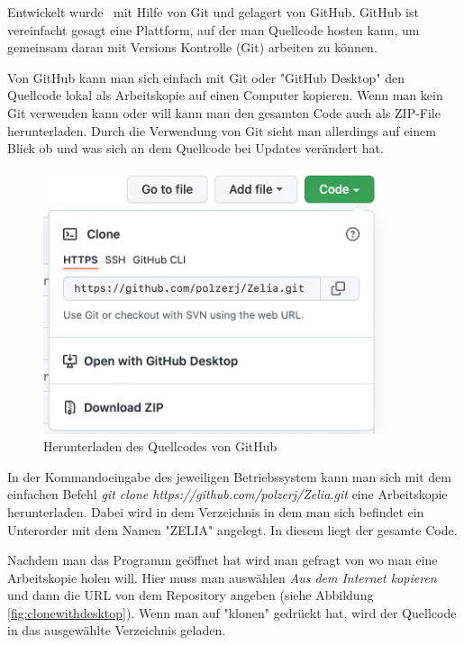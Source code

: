 
Entwickelt wurde \ZELIA\ mit Hilfe von Git und gelagert von GitHub. GitHub ist vereinfacht gesagt eine Plattform, auf der man Quellcode hosten kann, um gemeinsam daran mit Versions Kontrolle (Git) arbeiten zu können. 

Von GitHub kann man sich einfach mit Git oder "GitHub Desktop" den Quellcode lokal als Arbeitskopie auf einen Computer kopieren. Wenn man kein Git verwenden kann oder will kann man den gesamten Code auch als ZIP-File herunterladen. Durch die Verwendung von Git sieht man allerdings auf einem Blick ob und was sich an dem Quellcode bei Updates verändert hat.

\begin{figure}[H]
    \centering
    \includegraphics[width=100mm]{media/Handbuch/GitHub_Download.png}
    \caption{Herunterladen des Quellcodes von GitHub}
\end{figure}


In der Kommandoeingabe des jeweiligen Betriebssystem kann man sich mit dem einfachen Befehl \emph{git clone https://github.com/polzerj/Zelia.git} eine Arbeitskopie herunterladen. Dabei wird in dem Verzeichnis in dem man sich befindet ein Unterorder mit dem Namen "ZELIA" angelegt. In diesem liegt der gesamte Code.

\begin{minipage}{\textwidth}
    
    Nachdem man das Programm geöffnet hat wird man gefragt von wo man eine Arbeitskopie holen will. Hier muss man auswählen \emph{Aus dem Internet kopieren} und dann die URL von dem Repository angeben (siehe Abbildung \ref{fig:clonewithdesktop}). Wenn man auf "klonen" gedrückt hat, wird der Quellcode in das ausgewählte Verzeichnis geladen. 
\end{minipage}


